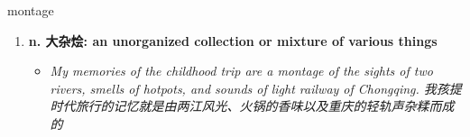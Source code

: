 
\begin{frame}
{\huge montage}
\begin{center}
\begin{enumerate}\Large
  \item \textbf{n. 大杂烩: an unorganized collection or mixture of various things}
  \begin{itemize}
    \item \em{\Large{My memories of the childhood trip are a montage of the sights of two rivers, smells of hotpots, and sounds of light railway of Chongqing. 我孩提时代旅行的记忆就是由两江风光、火锅的香味以及重庆的轻轨声杂糅而成的}}
  \end{itemize}
\end{enumerate}
\end{center}
\end{frame}
